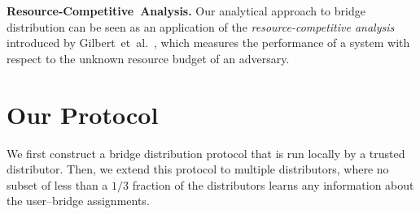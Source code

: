 \documentclass[letterpaper,twocolumn,10pt]{article}
\newcommand{\etal}{et~al.}
\newcommand{\sfsize}{\fontsize{0.73\baselineskip}{0.73\baselineskip}\selectfont}
\newcommand{\sans}[1]{\textsf{\sfsize \mbox{#1}}}
\newcommand{\sansb}[1]{\textbf{\sans{\mbox{#1}}}}
\newcommand{\para}[1]{\vspace{0.55em} \noindent \sansb{{\mbox{#1}}}}
\begin{document}


\para{Resource-Competitive Analysis.} Our analytical approach to bridge distribution can be seen as an application of the \emph{resource-competitive analysis} introduced by Gilbert~\etal~\cite{Gilbert:2012:RAN:2335470.2335471,Bender:2015:SIGACT}, which measures the performance of a system with respect to the unknown resource budget of an adversary. %

\section{Our Protocol} \label{sec:algorithm} 
We first construct a bridge distribution protocol that is run locally by a trusted distributor. Then, we extend this protocol to multiple distributors, where no subset of less than a $1/3$ fraction of the distributors learns any information about the user--bridge assignments.
\end{document}
